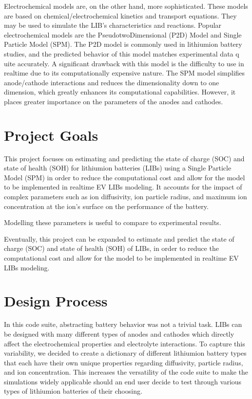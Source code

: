 \documentclass[letterpaper,10pt,english]{sphinxmanual}
\begin{document}
\sphinxAtStartPar
Electrochemical models are, on the other hand, more sophisticated. These
models are based on chemical/electrochemical kinetics and transport equations.
They may be used to simulate the LIB’s characteristics and reactions. Popular
electrochemical models are the Pseudo\sphinxhyphen{}two\sphinxhyphen{}Dimensional (P2D) Model and Single
Particle Model (SPM). The P2D model is commonly used in lithium\sphinxhyphen{}ion battery
studies, and the predicted behavior of this model matches experimental data q
uite accurately. A significant drawback with this model is the difficulty to
use in real\sphinxhyphen{}time due to its computationally expensive nature. The SPM model
simplifies anode/cathode interactions and reduces the dimensionality down to
one dimension, which greatly enhances its computational capabilities. However,
it places greater importance on the parameters of the anodes and cathodes.


\chapter{Project Goals}
\label{\detokenize{project_goals:project-goals}}\label{\detokenize{project_goals::doc}}
\sphinxAtStartPar
This project focuses on estimating and predicting the state of charge (SOC)
and state of health (SOH) for lithium\sphinxhyphen{}ion batteries (LIBs) using a Single
Particle Model (SPM) in order to reduce the computational cost and allow
for the model to be implemented in real\sphinxhyphen{}time EV LIBs modeling. It accounts
for the impact of complex parameters such as ion diffusivity, ion particle
radius, and maximum ion concentration at the ion’s surface on the
performance of the battery.

\sphinxAtStartPar
Modelling these parameters is useful to compare to experimental results.

\sphinxAtStartPar
Eventually, this project can be expanded to estimate and predict the state
of charge (SOC) and state of health (SOH) of LIBs, in order to reduce the
computational cost and allow for the model to be implemented in real\sphinxhyphen{}time
EV LIBs modeling.


\chapter{Design Process}
\label{\detokenize{design_process:design-process}}\label{\detokenize{design_process::doc}}
\sphinxAtStartPar
In this code suite, abstracting battery behavior was not a trivial task.
LIBs can be designed with many different types of anodes and cathodes
which directly affect the electro\sphinxhyphen{}chemical properties and electrolyte
interactions. To capture this variability, we decided to create a
dictionary of different lithium\sphinxhyphen{}ion battery types that each have
their own unique properties regarding diffusivity, particle radius,
and ion concentration. This increases the versatility of the code
suite to make the simulations widely applicable should an end user
decide to test through various types of lithium\sphinxhyphen{}ion batteries of
their choosing.
\end{document}
